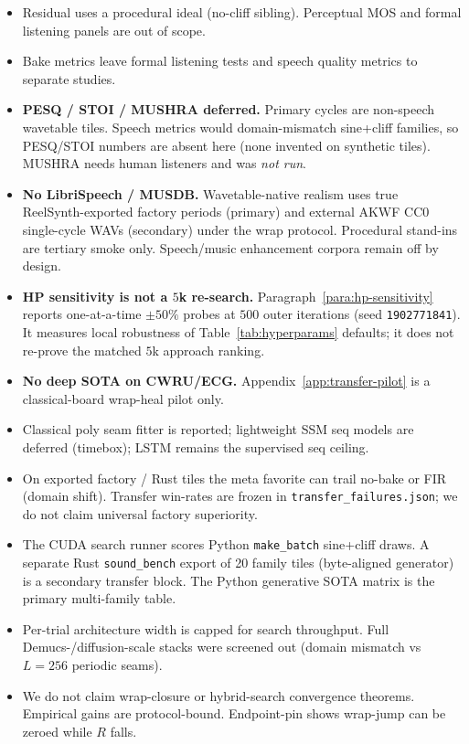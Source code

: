 \begin{itemize}
  \item Residual uses a procedural ideal (no-cliff sibling). Perceptual MOS and formal listening panels are out of scope.
  \item Bake metrics leave formal listening tests and speech quality metrics to separate studies.
  \item \textbf{PESQ / STOI / MUSHRA deferred.} Primary cycles are non-speech wavetable tiles. Speech metrics would domain-mismatch sine{+}cliff families, so PESQ/STOI numbers are absent here (none invented on synthetic tiles). MUSHRA needs human listeners and was \emph{not run}.
  \item \textbf{No LibriSpeech / MUSDB.} Wavetable-native realism uses true ReelSynth-exported factory periods (primary) and external AKWF CC0 single-cycle WAVs (secondary) under the wrap protocol. Procedural stand-ins are tertiary smoke only. Speech/music enhancement corpora remain off by design.
  \item \textbf{HP sensitivity is not a $5$k re-search.} Paragraph~\ref{para:hp-sensitivity} reports one-at-a-time $\pm 50\%$ probes at $500$ outer iterations (seed \texttt{1902771841}). It measures local robustness of Table~\ref{tab:hyperparams} defaults; it does not re-prove the matched $5$k approach ranking.
  \item \textbf{No deep SOTA on CWRU/ECG.} Appendix~\ref{app:transfer-pilot} is a classical-board wrap-heal pilot only.
  \item Classical poly seam fitter is reported; lightweight SSM seq models are deferred (timebox); LSTM remains the supervised seq ceiling.
  \item On exported factory / Rust tiles the meta favorite can trail no-bake or FIR (domain shift). Transfer win-rates are frozen in \texttt{transfer\_failures.json}; we do not claim universal factory superiority.
  \item The CUDA search runner scores Python \texttt{make\_batch} sine{+}cliff draws. A separate Rust \texttt{sound\_bench} export of 20 family tiles (byte-aligned generator) is a secondary transfer block. The Python generative SOTA matrix is the primary multi-family table.
  \item Per-trial architecture width is capped for search throughput. Full Demucs-/diffusion-scale stacks were screened out (domain mismatch vs $L{=}256$ periodic seams).
  \item We do not claim wrap-closure or hybrid-search convergence theorems. Empirical gains are protocol-bound. Endpoint-pin shows wrap-jump can be zeroed while $R$ falls.

\end{itemize}
